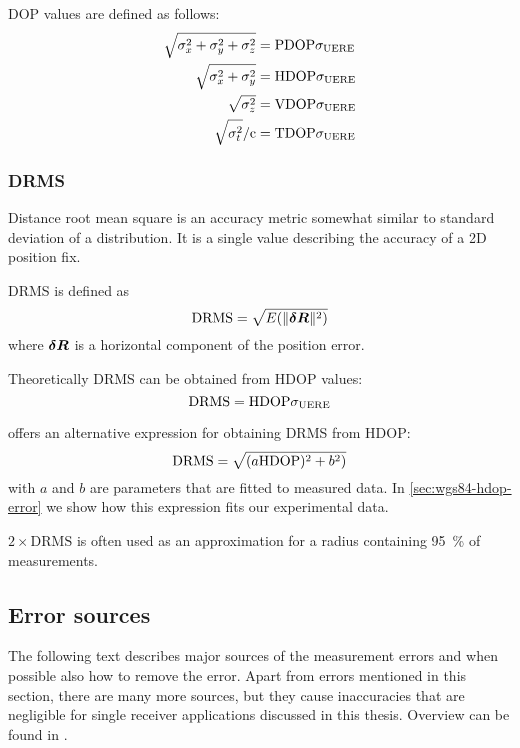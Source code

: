 DOP values are defined as follows:
\begin{subequations}
	\label{eq:dop-def}
\begin{align}
	\sqrt{\sigma^2_x + \sigma^2_y + \sigma^2_z} &= \mathrm{PDOP} \sigma_{\mathrm{UERE}} \\
	\sqrt{\sigma^2_x + \sigma^2_y} &= \mathrm{HDOP} \sigma_{\mathrm{UERE}} \\
	\sqrt{\sigma^2_z} &= \mathrm{VDOP} \sigma_{\mathrm{UERE}} \\
	\sqrt{\sigma^2_t} / \mathrm{c} &= \mathrm{TDOP} \sigma_{\mathrm{UERE}}
\end{align}
\end{subequations}

\subsubsection{DRMS}
Distance root mean square is an accuracy metric somewhat similar to
standard deviation of a distribution.
It is a single value describing the accuracy of a 2D position fix.

DRMS is defined as
\begin{equation}
	\mathrm{DRMS} = \sqrt{E(\lVert\bm{\delta{}R}\rVert^2)}
\end{equation}
where \(\bm{\delta{}R}\) is a horizontal component of the position error.

Theoretically DRMS can be obtained from HDOP values:
\begin{equation}
	\mathrm{DRMS} = \mathrm{HDOP} \sigma_{\mathrm{UERE}}
\end{equation}

\cite{www-wilson} offers an alternative expression for obtaining
DRMS from HDOP:
\begin{equation}
	\mathrm{DRMS} = \sqrt{(a \mathrm{HDOP})^2 + b^2)}
\end{equation}
with \(a\) and \(b\) are parameters that are fitted to measured data.
In \cref{sec:wgs84-hdop-error} we show how this expression fits our experimental data.

\(2 \times \mathrm{DRMS}\) is often used as an approximation for a radius containing
\SI{95}{\percent} of measurements.

\subsection{Error sources}

The following text describes major sources of the measurement errors and when possible
also how to remove the error.
Apart from errors mentioned in this section, there are many more sources, but they cause inaccuracies
that are negligible for single receiver applications discussed in this thesis.
Overview can be found in \cite{kouba09}.

